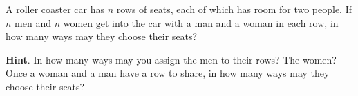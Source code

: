\documentclass{book}
\begin{document}
\setcounter{cpjt}{87}
\addtocounter{cpjt}{-1}
\begin{activity}\label{activity-80}
\hypertarget{p-639}{}%
A roller coaster car has \(n\) rows of seats, each of which has room for two people. If \(n\) men and \(n\) women get into the car with a man and a woman in each row, in how many ways may they choose their seats?%
\par\smallskip%
\noindent\textbf{Hint}.\hypertarget{hint-41}{}\quad%
\hypertarget{p-640}{}%
In how many ways may you assign the men to their rows? The women? Once a woman and a man have a row to share, in how many ways may they choose their seats?%
\par\smallskip%
\noindent\end{activity}

\clearpage
\end{document}
